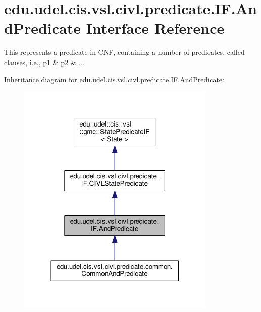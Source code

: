 \hypertarget{interfaceedu_1_1udel_1_1cis_1_1vsl_1_1civl_1_1predicate_1_1IF_1_1AndPredicate}{}\section{edu.\+udel.\+cis.\+vsl.\+civl.\+predicate.\+I\+F.\+And\+Predicate Interface Reference}
\label{interfaceedu_1_1udel_1_1cis_1_1vsl_1_1civl_1_1predicate_1_1IF_1_1AndPredicate}


This represents a predicate in C\+N\+F, containing a number of predicates, called clauses, i.\+e., p1 \& p2 \& ...  




Inheritance diagram for edu.\+udel.\+cis.\+vsl.\+civl.\+predicate.\+I\+F.\+And\+Predicate\+:
\nopagebreak
\begin{figure}[H]
\begin{center}
\leavevmode
\includegraphics[width=269pt]{interfaceedu_1_1udel_1_1cis_1_1vsl_1_1civl_1_1predicate_1_1IF_1_1AndPredicate__inherit__graph}
\end{center}
\end{figure}


